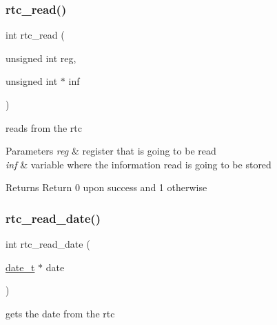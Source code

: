 \subsubsection{\texorpdfstring{rtc\+\_\+read()}{rtc\_read()}}
{\footnotesize\ttfamily int rtc\+\_\+read (\begin{DoxyParamCaption}\item[{unsigned int}]{reg,  }\item[{unsigned int $\ast$}]{inf }\end{DoxyParamCaption})}



reads from the rtc 


\begin{DoxyParams}{Parameters}
{\em reg} & register that is going to be read\\
\hline
{\em inf} & variable where the information read is going to be stored\\
\hline
\end{DoxyParams}
\begin{DoxyReturn}{Returns}
Return 0 upon success and 1 otherwise 
\end{DoxyReturn}
\hypertarget{group__rtc_ga83dbab748017bcc8531622b94cca1be1}{}\label{group__rtc_ga83dbab748017bcc8531622b94cca1be1} 
\subsubsection{\texorpdfstring{rtc\+\_\+read\+\_\+date()}{rtc\_read\_date()}}
{\footnotesize\ttfamily int rtc\+\_\+read\+\_\+date (\begin{DoxyParamCaption}\item[{\hyperlink{structdate__t}{date\+\_\+t} $\ast$}]{date }\end{DoxyParamCaption})}



gets the date from the rtc 


